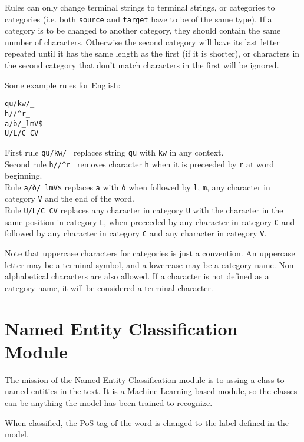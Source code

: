 \documentclass[a4paper]{book}
\begin{document}
 Rules can only change terminal strings to terminal strings, or
 categories to categories (i.e. both \verb#source# and \verb#target#
 have to be of the same type).  If a category is to be changed to
 another category, they should contain the same number of
 characters. Otherwise the second category will have its last letter
 repeated until it has the same length as the first (if it is
 shorter), or characters in the second category that don't match
 characters in the first will be ignored.

 Some example rules for English:
\begin{verbatim}
qu/kw/_
h//^r_
a/ò/_lmV$
U/L/C_CV
\end{verbatim}

 First rule \verb#qu/kw/_# replaces string \verb#qu# with \verb#kw# in
 any context. \\
 Second rule \verb#h//^r_# removes character \verb#h#
 when it is preceeded by \verb#r# at word beginning.\\ 
 Rule \verb#a/ò/_lmV$# replaces \verb#a# with \verb#ò# when followed by
 \verb#l#, \verb#m#, any character in category \verb#V# and the end of
 the word.\\ 
 Rule \verb#U/L/C_CV# replaces any character in category
 \verb#U# with the character in the same position in category
 \verb#L#, when preceeded by any character in category \verb#C# and
 followed by any character in category \verb#C# and any character in 
 category \verb#V#. 

 Note that uppercase characters for categories is just a convention.
 An uppercase letter may be a terminal symbol, and a lowercase may be
 a category name. Non-alphabetical characters are also allowed.
 If a character is not defined as a category name, it will be considered 
 a terminal character.




\section{Named Entity Classification Module}
\label{file-nec}

  The mission of the Named Entity Classification module is to assing a
  class to named entities in the text. It is a Machine-Learning based
  module, so the classes can be anything the model has been trained to
  recognize.

  When classified, the PoS tag of the word is changed to the label
  defined in the model.
\end{document}

